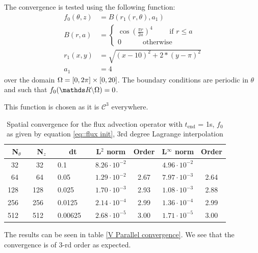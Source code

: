 The convergence is tested using the following function:
\begin{align}
 f_0(\theta,z)&=B(r_1(r,\theta),a_1) \label{eq::flux init}\\
 B(r,a) &= 
 \begin{cases}
  \cos\left(\frac{\pi r}{2 a}\right)^4\quad\quad \text{ if }r\leq a\\
  0\quad\quad\quad \text{otherwise}
 \end{cases}\nonumber\\
 r_1(x,y) &= \sqrt{(x-10)^2+2*(y-\pi)^2}\nonumber\\
 a_1 &= 4\nonumber
\end{align}
over the domain $\Omega=[0,2\pi]\times[0,20]$. The boundary conditions are periodic in $\theta$ and such that $f_0(\reel\backslash\Omega)=0$.

This function is chosen as it is $\mathcal{C}^3$ everywhere.

\begin{table}[ht]
\centering
 \begin{tabular}{|r c|r c|l c|c|c|c|c|}
  \hline
  \multicolumn{2}{|c|}{\bf N$_\theta$} & \multicolumn{2}{|c|}{\bf N$_z$} & \multicolumn{2}{|c|}{\bf dt} & \bf L$^2$ norm       & \bf Order & \bf L$^\infty$ norm  & \bf Order\\
  \hline
  32  & &  32  & &  0.1     & & $ 8.26 \cdot 10^{ -2 }$ &       & $ 4.96 \cdot 10^{ -2 }$ &  \\
  \hline
  64  & &  64  & &  0.05     & & $ 1.29 \cdot 10^{ -2 }$ &  2.67  & $ 7.97 \cdot 10^{ -3 }$ &  2.64  \\
  \hline
  128  & &  128  & &  0.025     & & $ 1.70 \cdot 10^{ -3 }$ &  2.93  & $ 1.08 \cdot 10^{ -3 }$ &  2.88  \\
  \hline
  256  & &  256  & &  0.0125     & & $ 2.14 \cdot 10^{ -4 }$ &  2.99  & $ 1.36 \cdot 10^{ -4 }$ &  2.99  \\
  \hline
  512  & &  512  & &  0.00625     & & $ 2.68 \cdot 10^{ -5 }$ &  3.00  & $ 1.71 \cdot 10^{ -5 }$ &  3.00  \\
  \hline
 \end{tabular}
 \caption{\label{Flux dx convergence} Spatial convergence for the flux advection operator with $t_{\text{end}}$ = 1s, $f_0$ as given by equation \ref{eq::flux init}, 3rd degree Lagrange interpolation}
\end{table}

The results can be seen in table \ref{V Parallel convergence}. We see that the convergence is of 3-rd order as expected.